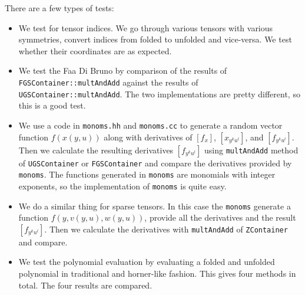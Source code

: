 \documentclass[11pt,a4paper]{article}
\begin{document}
There are a few types of tests:
\begin{itemize}
\item We test for tensor indices. We go through various tensors with
various symmetries, convert indices from folded to unfolded and
vice-versa. We test whether their coordinates are as expected.
\item We test the Faa Di Bruno by comparison of the results of
\texttt{FGSContainer::multAndAdd} against the results of \texttt{UGSContainer::multAndAdd}. The two
 implementations are pretty different, so this is a good test.
\item We use a code in {\tt monoms.hh} and {\tt monoms.cc} to generate a
 random vector function $f(x(y,u))$ along with derivatives of
 $\left[f_x\right]$, $\left[x_{y^ku^l}\right]$, and
 $\left[f_{y^ku^l}\right]$. Then we calculate the resulting derivatives
 $\left[f_{y^ku^l}\right]$ using \texttt{multAndAdd} method of \texttt{UGSContainer}
 or \texttt{FGSContainer} and compare the derivatives provided by {\tt
 monoms}. The functions generated in {\tt monoms} are monomials with
 integer exponents, so the implementation of {\tt monoms} is quite
 easy.
\item We do a similar thing for sparse tensors. In this case the {\tt monoms}
 generate a function $f(y,v(y,u),w(y,u))$, provide all the derivatives
 and the result $\left[f_{y^ku^l}\right]$. Then we calculate the
 derivatives with \texttt{multAndAdd} of \texttt{ZContainer} and compare.
\item We test the polynomial evaluation by evaluating a folded and
 unfolded polynomial in traditional and horner-like fashion. This gives
 four methods in total. The four results are compared.
\end{itemize}
\end{document}
